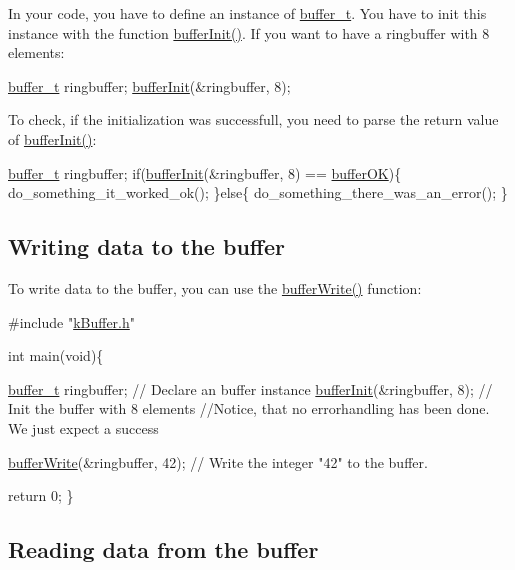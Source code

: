  In your code, you have to define an instance of \hyperlink{structbuffer__t}{buffer\+\_\+t}. You have to init this instance with the function \hyperlink{k_buffer_8c_aec18d6ea571b1326dbeb7ca15f4969c0}{buffer\+Init()}. If you want to have a ringbuffer with 8 elements\+: 
\begin{DoxyCode}
\hyperlink{structbuffer__t}{buffer\_t} ringbuffer;
\hyperlink{k_buffer_8c_aec18d6ea571b1326dbeb7ca15f4969c0}{bufferInit}(&ringbuffer, 8);
\end{DoxyCode}
 To check, if the initialization was successfull, you need to parse the return value of \hyperlink{k_buffer_8c_aec18d6ea571b1326dbeb7ca15f4969c0}{buffer\+Init()}\+: 
\begin{DoxyCode}
\hyperlink{structbuffer__t}{buffer\_t} ringbuffer;
\textcolor{keywordflow}{if}(\hyperlink{k_buffer_8c_aec18d6ea571b1326dbeb7ca15f4969c0}{bufferInit}(&ringbuffer, 8) == \hyperlink{k_buffer_8h_a7a0bf550b7bd49d85172e409c0034fe6a69e32851bd2f089b06555decd80aac1b}{bufferOK})\{
 do\_something\_it\_worked\_ok();
\}\textcolor{keywordflow}{else}\{
 do\_something\_there\_was\_an\_error();
\}
\end{DoxyCode}
 \hypertarget{index_write}{}\subsection{Writing data to the buffer}\label{index_write}
To write data to the buffer, you can use the \hyperlink{k_buffer_8c_a9d6410a89adf65a3ef12340ecb9bbd55}{buffer\+Write()} function\+: 
\begin{DoxyCode}
\textcolor{preprocessor}{#include "\hyperlink{k_buffer_8h}{kBuffer.h}"}

\textcolor{keywordtype}{int} main(\textcolor{keywordtype}{void})\{

 \hyperlink{structbuffer__t}{buffer\_t} ringbuffer;            \textcolor{comment}{// Declare an buffer instance}
 \hyperlink{k_buffer_8c_aec18d6ea571b1326dbeb7ca15f4969c0}{bufferInit}(&ringbuffer, 8);     \textcolor{comment}{// Init the buffer with 8 elements}
 \textcolor{comment}{//Notice, that no errorhandling has been done. We just expect a success}
 
 \hyperlink{k_buffer_8c_a9d6410a89adf65a3ef12340ecb9bbd55}{bufferWrite}(&ringbuffer, 42);   \textcolor{comment}{// Write the integer "42" to the buffer.}

 \textcolor{keywordflow}{return} 0;
\}
\end{DoxyCode}
 \hypertarget{index_read}{}\subsection{Reading data from the buffer}\label{index_read}
